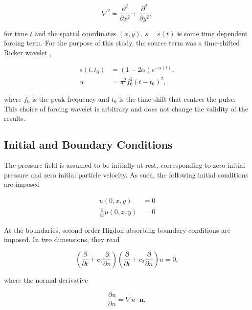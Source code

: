 \documentclass[final-report]{report-template}
\begin{document}
\begin{equation}
    \nabla^2
    =
    \frac{\partial^2}{\partial x^2}
    +
    \frac{\partial^2}{\partial y^2},
    \label{eq:lap}
\end{equation}

for time $t$ and the spatial coordinates $(x,y)$. $s = s(t)$ is some time dependent forcing term. For the purpose of this study, the source term was a time-shifted Ricker wavelet \cite{rickerWaveletFunctionsTheir1944}, 

\begin{align}
    s(t, t_0) &= \left( 1 - 2\alpha \right)e^{ -\alpha(t)}, \label{eq:ricker}\\
    \alpha &= \pi^2 f^2_0(t - t_0)^2,
\end{align}

where $f_0$ is the peak frequency and $t_0$ is the time shift that centres the pulse. This choice of forcing wavelet is arbitrary and does not change the validity of the results.

\subsection{Initial and Boundary Conditions}
\label{subsect:conditions}

The pressure field is assumed to be initially at rest, corresponding to zero initial pressure and zero initial particle velocity. As such, the following initial conditions are imposed

\begin{align}
    u(0, x, y) &= 0 \label{eq:u0} \\
    \frac{\partial}{\partial t}u(0, x, y) & = 0 \label{eq:ut0}
\end{align}

At the boundaries, second order Higdon \cite{higdonNumericalAbsorbingBoundary1987a} absorbing boundary conditions are imposed. In two dimensions, they read

\begin{equation}
    \left( \frac{\partial}{\partial t} + c_1 \frac{\partial}{\partial n} \right)
    \left( \frac{\partial}{\partial t} + c_2 \frac{\partial}{\partial n} \right) u = 0,
    \label{eq:higdon}
\end{equation}

where the normal derivative

\begin{equation}
    \frac {\partial u} {\partial n} = \nabla u \cdot \mathbf{n},
    \label{eq:dudn}
\end{equation}
\end{document}

